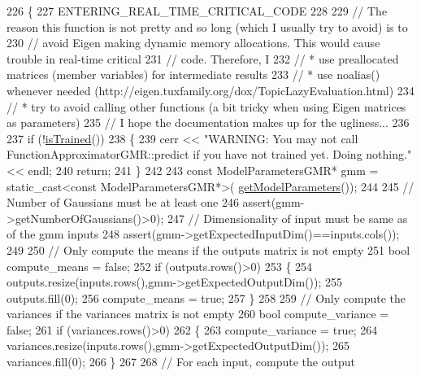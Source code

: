 \begin{DoxyCode}
226 \{
227   ENTERING\_REAL\_TIME\_CRITICAL\_CODE
228   
229   \textcolor{comment}{// The reason this function is not pretty and so long (which I usually try to avoid) is to  }
230   \textcolor{comment}{// avoid Eigen making dynamic memory allocations. This would cause trouble in real-time critical}
231   \textcolor{comment}{// code. Therefore, I}
232   \textcolor{comment}{//   * use preallocated matrices (member variables) for intermediate results}
233   \textcolor{comment}{//   * use noalias() whenever needed (http://eigen.tuxfamily.org/dox/TopicLazyEvaluation.html)}
234   \textcolor{comment}{//   * try to avoid calling other functions (a bit tricky when using Eigen matrices as parameters)}
235   \textcolor{comment}{// I hope the documentation makes up for the ugliness...}
236   
237   \textcolor{keywordflow}{if} (!\hyperlink{classDmpBbo_1_1FunctionApproximator_a178135f623d9b9058870851a53299c6e}{isTrained}())  
238   \{
239     cerr << \textcolor{stringliteral}{"WARNING: You may not call FunctionApproximatorGMR::predict if you have not trained yet. Doing
       nothing."} << endl;
240     \textcolor{keywordflow}{return};
241   \}
242   
243   \textcolor{keyword}{const} ModelParametersGMR* gmm = \textcolor{keyword}{static\_cast<}\textcolor{keyword}{const }ModelParametersGMR*\textcolor{keyword}{>}(
      \hyperlink{classDmpBbo_1_1FunctionApproximator_a0e7e116ed9b159d782fca544dacb4bac}{getModelParameters}());
244 
245   \textcolor{comment}{// Number of Gaussians must be at least one}
246   assert(gmm->getNumberOfGaussians()>0);
247   \textcolor{comment}{// Dimensionality of input must be same as of the gmm inputs  }
248   assert(gmm->getExpectedInputDim()==inputs.cols());
249 
250   \textcolor{comment}{// Only compute the means if the outputs matrix is not empty}
251   \textcolor{keywordtype}{bool} compute\_means = \textcolor{keyword}{false};
252   \textcolor{keywordflow}{if} (outputs.rows()>0)
253   \{
254     outputs.resize(inputs.rows(),gmm->getExpectedOutputDim());
255     outputs.fill(0);
256     compute\_means = \textcolor{keyword}{true};
257   \}
258   
259   \textcolor{comment}{// Only compute the variances if the variances matrix is not empty}
260   \textcolor{keywordtype}{bool} compute\_variance = \textcolor{keyword}{false};
261   \textcolor{keywordflow}{if} (variances.rows()>0)
262   \{
263     compute\_variance = \textcolor{keyword}{true};
264     variances.resize(inputs.rows(),gmm->getExpectedOutputDim());
265     variances.fill(0);
266   \}
267 
268   \textcolor{comment}{// For each input, compute the output  }

\end{DoxyCode}

